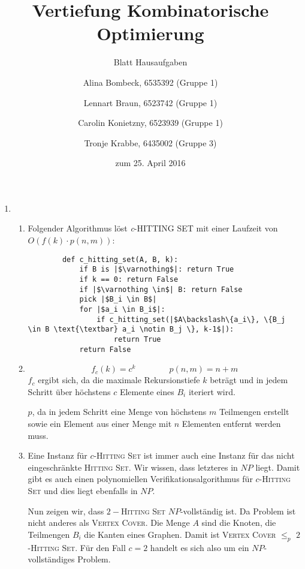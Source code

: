 \documentclass[a4paper]{scrartcl}
\title{Vertiefung Kombinatorische Optimierung}
\subtitle{Blatt {\blattnr} Hausaufgaben}
\author{%
    Alina Bombeck, 6535392 (Gruppe 1) \and
    Lennart Braun, 6523742 (Gruppe 1) \and
    Carolin Konietzny, 6523939 (Gruppe 1) \and
    Tronje Krabbe, 6435002 (Gruppe 3)
}
\date{zum 25. April 2016}
\begin{document}
\maketitle


\begin{enumerate}[label=\bfseries \arabic*.]
\item %
\begin{enumerate}
    \item %
        Folgender Algorithmus löst \textit{c}-HITTING SET mit einer Laufzeit von \\
        $O(f(k) \cdot p(n, m))$:
        \begin{verbatim}
        def c_hitting_set(A, B, k):
            if B is |$\varnothing$|: return True
            if k == 0: return False
            if |$\varnothing \in$| B: return False
            pick |$B_i \in B$|
            for |$a_i \in B_i$|:
                if c_hitting_set(|$A\backslash\{a_i\}, \{B_j \in B \text{\textbar} a_i \notin B_j \}, k-1$|):
                    return True
            return False
        \end{verbatim}

    \item %
        \begin{equation*}
            f_c(k) = c^k
            \qquad \qquad
            p(n,m) = n + m
        \end{equation*}
        $f_c$ ergibt sich, da die maximale Rekursionstiefe $k$ beträgt und in
        jedem Schritt über höchstens $c$ Elemente eines $B_i$ iteriert wird.

        $p$, da in jedem Schritt eine Menge von höchstens $m$ Teilmengen
        erstellt sowie ein Element aus einer Menge mit $n$ Elementen entfernt
        werden muss.

    \item %
        Eine Instanz für $c$-\textsc{Hitting Set} ist immer auch eine Instanz
        für das nicht eingeschränkte \textsc{Hitting Set}.
        Wir wissen, dass letzteres in $NP$ liegt.
        Damit gibt es auch einen polynomiellen Verifikationsalgorithmus für
        $c$-\textsc{Hitting Set} und dies liegt ebenfalls in $NP$.

        Nun zeigen wir, dass $2-$\textsc{Hitting Set} $NP$-vollständig ist.  Da
        Problem ist nicht anderes als \textsc{Vertex Cover}. Die Menge $A$ sind
        die Knoten, die Teilmengen $B_i$ die Kanten eines Graphen.
        Damit ist \textsc{Vertex Cover} $\leq_p$ $2$-\textsc{Hitting Set}.
        Für den Fall $c = 2$ handelt es sich also um ein $NP$-vollständiges
        Problem.


\end{enumerate}
\end{enumerate}
\end{document}
